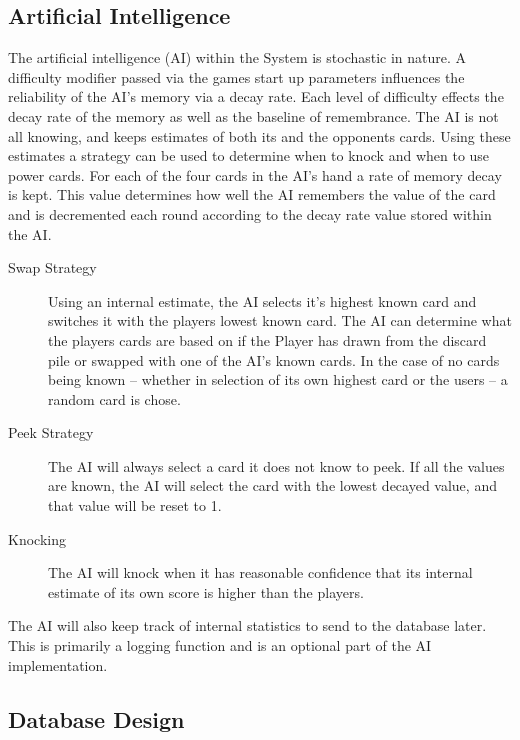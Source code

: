 \documentclass[12pt]{IEEEtran}
\begin{document}
\subsection{Artificial Intelligence}
\label{subsec:ai}

	The artificial intelligence (AI) within the System is stochastic in nature. A difficulty modifier passed via the games start up 	parameters influences the reliability of the AI's memory via a decay rate. Each level of difficulty effects the decay rate 			of the memory as well as the baseline of remembrance. The AI is not all knowing, and keeps estimates of both its and 			the opponents cards. Using these estimates a strategy can 	be used to determine when to knock and when to use 			power cards. For each of the four cards in the AI's hand a rate of memory decay is kept. This value determines how well 	the AI remembers the value of the card and is decremented each round according to the decay rate value 				stored within the AI.

	\begin{description}
		\item[Swap Strategy] \hspace{3em} Using an internal estimate, the AI selects it's highest known card and 						switches it with the players lowest known card. The AI can determine what the players cards are based on 				if the Player has drawn from the discard pile or swapped with one of the AI's known cards. In the case of 					no cards being known -- whether in selection of its own highest card or the users -- a random card is 					chose. 
		\item[Peek Strategy] \hspace{3em} The AI will always select a card it does not know to peek. If all the values are 			known, the AI will select the card with the lowest decayed value, and that value will be reset to 1.
		\item[Knocking] \hspace{3em}  The AI will knock when it has reasonable confidence that its internal estimate of its 			own score is higher than the players.
	\end{description}

	The AI will also keep track of internal statistics to send to the database later. This is primarily a logging function and is an 	optional part of the AI implementation.

\subsection{Database Design}
\label{subsec:dbdesign}
\end{document}
